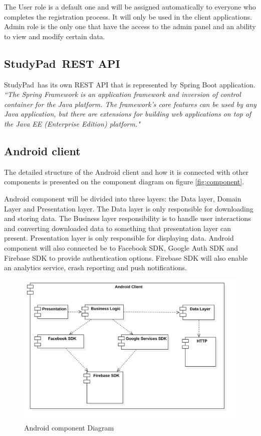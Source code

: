 \documentclass[thesis=B,english]{FITthesis}[2012/10/20]
\newcommand{\appname}{StudyPad}
\newcommand{\quoting}[1]{\textit{``#1"}}
\begin{document}
The User role is a default one and will be assigned automatically to everyone who completes the registration process. It will only be used in the client applications.
Admin role is the only one that have the access to the admin panel and an ability to view and modify certain data.

\subsection{\appname\ REST API}
\appname\ has its own REST API that is represented by Spring Boot application. \cite{studypad-backend} \quoting{The Spring Framework is an application framework and inversion of control container for the Java platform. The framework's core features can be used by any Java application, but there are extensions for building web applications on top of the Java EE (Enterprise Edition) platform.} \cite{wiki-spring}

\subsection{Android client}

The detailed structure of the Android client and how it is connected with other components is presented on the component diagram on figure \ref{fig:component}. 

 Android component will be divided into three layers: the Data layer, Domain Layer and Presentation layer. The Data layer is only responsible for downloading and storing data. The Business layer responsibility is to handle user interactions and converting downloaded data to something that presentation layer can present. Presentation layer is only responsible for displaying data. Android component will also connected be to Facebook SDK, Google Auth SDK and Firebase SDK to provide authentication options. Firebase SDK will also enable an analytics service, crash reporting and push notifications.


\begin{figure}[H]
\centering
  \includegraphics[scale=0.25]{androiddiagram}
  \caption{Android component Diagram}
  \label{fig:android-component}
\end{figure}
\end{document}

